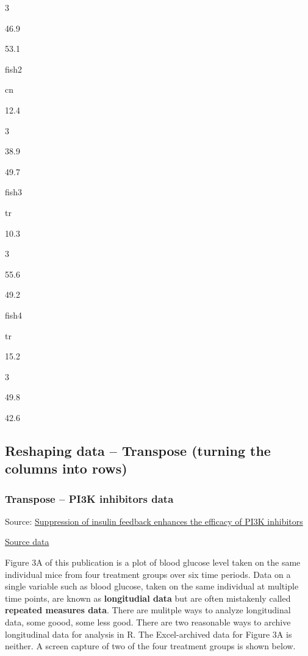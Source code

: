 \documentclass[]{book}
\begin{document}
3

46.9

53.1

fish2

cn

12.4

3

38.9

49.7

fish3

tr

10.3

3

55.6

49.2

fish4

tr

15.2

3

49.8

42.6

\hypertarget{reshaping-data-transpose-turning-the-columns-into-rows}{%
\subsection{Reshaping data -- Transpose (turning the columns into rows)}\label{reshaping-data-transpose-turning-the-columns-into-rows}}

\hypertarget{transpose-pi3k-inhibitors-data}{%
\subsubsection{Transpose -- PI3K inhibitors data}\label{transpose-pi3k-inhibitors-data}}

Source: \href{https://www.nature.com/articles/s41586-018-0343-4}{Suppression of insulin feedback enhances the efficacy of PI3K inhibitors}

\href{https://www.nature.com/articles/s41586-018-0343-4\#Sec15}{Source data}

Figure 3A of this publication is a plot of blood glucose level taken on the same individual mice from four treatment groups over six time periods. Data on a single variable such as blood glucose, taken on the same individual at multiple time points, are known as \textbf{longitudial data} but are often mistakenly called \textbf{repeated measures data}. There are mulitple ways to analyze longitudinal data, some goood, some less good. There are two reasonable ways to archive longitudinal data for analysis in R. The Excel-archived data for Figure 3A is neither. A screen capture of two of the four treatment groups is shown below.
\end{document}
